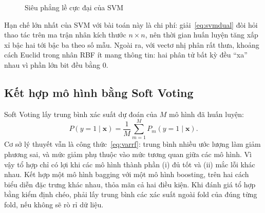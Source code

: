 \documentclass[12pt,a4paper,oneside]{report}
\begin{document}
\begin{figure}[H]
  \centering
  \caption{Siêu phẳng lề cực đại của SVM}
  \label{fig:svm}
\end{figure}

Hạn chế lớn nhất của SVM với bài toán này là chi phí: giải~\eqref{eq:svmdual}
đòi hỏi thao tác trên ma trận nhân kích thước $n \times n$, nên thời gian huấn
luyện tăng xấp xỉ bậc hai tới bậc ba theo số mẫu. Ngoài ra, với vectơ nhị phân
rất thưa, khoảng cách Euclid trong nhân RBF ít mang thông tin: hai phân tử bất
kỳ đều ``xa'' nhau vì phần lớn bit đều bằng 0.

\subsection{Kết hợp mô hình bằng Soft Voting}
Soft Voting lấy trung bình xác suất dự đoán của $M$ mô hình đã huấn luyện:
\begin{equation}
  P(y = 1 \mid \mathbf{x}) = \frac{1}{M}\sum_{m=1}^{M} P_m(y = 1 \mid \mathbf{x}).
  \label{eq:voting}
\end{equation}
Cơ sở lý thuyết vẫn là công thức~\eqref{eq:varrf}: trung bình nhiều ước lượng
làm giảm phương sai, và mức giảm phụ thuộc vào mức tương quan giữa các
mô hình. Vì vậy tổ hợp chỉ có lợi khi các mô hình thành phần (i) đủ tốt và
(ii) mắc lỗi khác nhau. Kết hợp một mô hình bagging với một mô hình
boosting, trên hai cách biểu diễn đặc trưng khác nhau, thỏa mãn cả hai điều
kiện. Khi đánh giá tổ
hợp bằng kiểm định chéo, phải lấy trung bình các xác suất ngoài fold của
đúng từng fold, nếu không sẽ rò rỉ dữ liệu.
\end{document}
